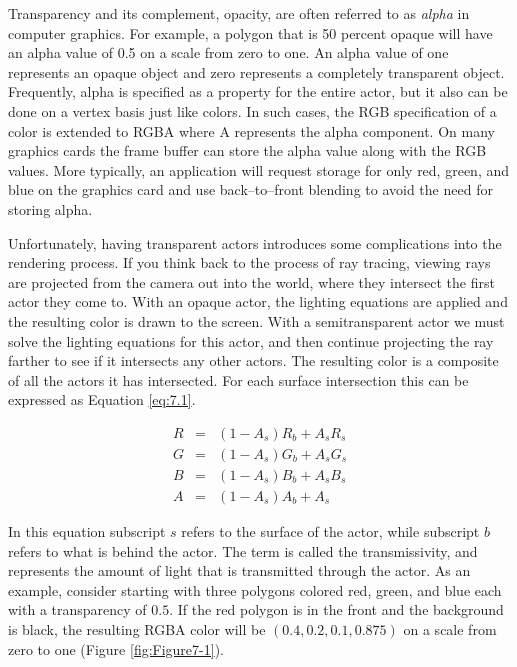Transparency and its complement, opacity, are often referred to as \emph{alpha} in computer graphics. For example, a polygon that is 50 percent opaque will have an alpha value of 0.5 on a scale from zero to one. An alpha value of one represents an opaque object and zero represents a completely transparent object. Frequently, alpha is specified as a property for the entire actor, but it also can be done on a vertex basis just like colors. In such cases, the RGB specification of a color is extended to RGBA where A represents the alpha component. On many graphics cards the frame buffer can store the alpha value along with the RGB values. More typically, an application will request storage for only red, green, and blue on the graphics card and use back--to--front blending to avoid the need for storing alpha.

Unfortunately, having transparent actors introduces some complications into the rendering process. If you think back to the process of ray tracing, viewing rays are projected from the camera out into the world, where they intersect the first actor they come to. With an opaque actor, the lighting equations are applied and the resulting color is drawn to the screen. With a semitransparent actor we must solve the lighting equations for this actor, and then continue projecting the ray farther to see if it intersects any other actors. The resulting color is a composite of all the actors it has intersected. For each surface intersection this can be expressed as Equation \ref{eq:7.1}.

\begin{equation}\label{eq:7.1}
\begin{array}{lll}
R &=& (1 - A_s) R_b + A_s R_s\\
G &=& (1 - A_s) G_b + A_s G_s\\
B &=& (1 - A_s) B_b + A_s B_s\\
A &=& (1 - A_s) A_b + A_s
\end{array}
\end{equation}

In this equation subscript $s$ refers to the surface of the actor, while subscript $b$ refers to what is behind the actor. The term is called the transmissivity, and represents the amount of light that is transmitted through the actor. As an example, consider starting with three polygons colored red, green, and blue each with a transparency of $0.5$. If the red polygon is in the front and the background is black, the resulting RGBA color will be $(0.4, 0.2, 0.1, 0.875)$ on a scale from zero to one (Figure \ref{fig:Figure7-1}).

